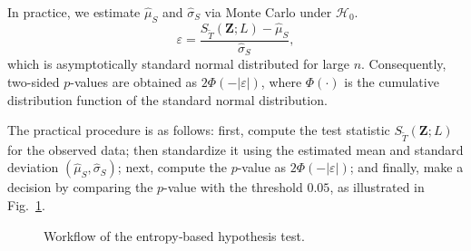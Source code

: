 \documentclass[
  lettersize  journal,
]{IEEEtran}%
\begin{document}
In practice, we estimate \(\widehat{\mu}_S\) and \(\widehat{\sigma}_S\)
via Monte Carlo under \(\mathcal{H}_0\). \begin{equation*}
\varepsilon = \frac{{S_{\widetilde{T}}(\bm{Z}; L) - \widehat{\mu}_S}}{{\widehat{\sigma}_S}},
\end{equation*} which is asymptotically standard normal distributed for
large \(n\). Consequently, two-sided \(p\)-values are obtained as
\(2\Phi(-|\varepsilon|)\), where \(\Phi(\cdot)\) is the cumulative
distribution function of the standard normal distribution.

The practical procedure is as follows: first, compute the test statistic
\(S_{\widetilde{T}}(\bm{Z}; L)\) for the observed data; then standardize
it using the estimated mean and standard deviation
\((\widehat{\mu}_S, \widehat{\sigma}_S)\); next, compute the \(p\)-value
as \(2\Phi(-|\varepsilon|)\); and finally, make a decision by comparing
the \(p\)-value with the threshold \(0.05\), as illustrated in
Fig.~\ref{fig:entropy-diagram-test}.

\begin{figure}[H]
    \centering
{}
    \caption{Workflow of the entropy‐based hypothesis test.}
    \label{fig:entropy-diagram-test}
\end{figure}
\end{document}
